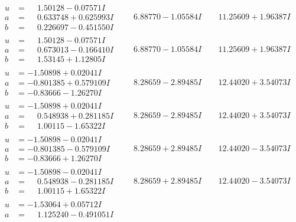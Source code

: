 \documentclass[1p]{elsarticle_modified}
\theoremstyle{definition}
\begin{document}
$$\begin{array}{c|c|c}
 \hline 
\begin{aligned}
u &= \phantom{-}1.50128 - 0.07571 I \\
a &= \phantom{-}0.633748 + 0.625993 I \\
b &= \phantom{-}0.226697 - 0.451550 I\end{aligned}
 & \phantom{-}6.88770 - 1.05584 I & \phantom{-}11.25609 + 1.96387 I \\ \hline\begin{aligned}
u &= \phantom{-}1.50128 - 0.07571 I \\
a &= \phantom{-}0.673013 - 0.166410 I \\
b &= \phantom{-}1.53145 + 1.12805 I\end{aligned}
 & \phantom{-}6.88770 - 1.05584 I & \phantom{-}11.25609 + 1.96387 I \\ \hline\begin{aligned}
u &= -1.50898 + 0.02041 I \\
a &= -0.801385 + 0.579109 I \\
b &= -0.83666 - 1.26270 I\end{aligned}
 & \phantom{-}8.28659 - 2.89485 I & \phantom{-}12.44020 + 3.54073 I \\ \hline\begin{aligned}
u &= -1.50898 + 0.02041 I \\
a &= \phantom{-}0.548938 + 0.281185 I \\
b &= \phantom{-}1.00115 - 1.65322 I\end{aligned}
 & \phantom{-}8.28659 - 2.89485 I & \phantom{-}12.44020 + 3.54073 I \\ \hline\begin{aligned}
u &= -1.50898 - 0.02041 I \\
a &= -0.801385 - 0.579109 I \\
b &= -0.83666 + 1.26270 I\end{aligned}
 & \phantom{-}8.28659 + 2.89485 I & \phantom{-}12.44020 - 3.54073 I \\ \hline\begin{aligned}
u &= -1.50898 - 0.02041 I \\
a &= \phantom{-}0.548938 - 0.281185 I \\
b &= \phantom{-}1.00115 + 1.65322 I\end{aligned}
 & \phantom{-}8.28659 + 2.89485 I & \phantom{-}12.44020 - 3.54073 I \\ \hline\begin{aligned}
u &= -1.53064 + 0.05712 I \\
a &= \phantom{-}1.125240 - 0.491051 I \\

\end{aligned}
\end{array}$$
\end{document}
